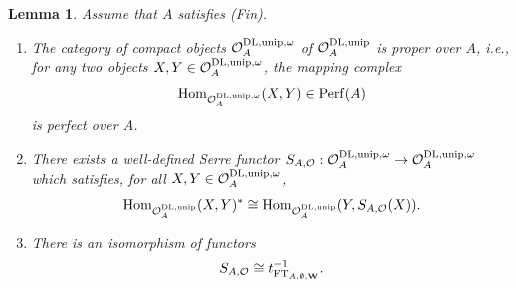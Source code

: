 \documentclass[a4paper, 10pt, oneside, reqno]{amsart}
\theoremstyle{plain}
\newtheorem{lem}[thm]{Lemma}
\theoremstyle{definition}
\theoremstyle{remark}
\newcommand{\FT}{\mathrm{FT}}
\begin{document}
\begin{lem}\label{lem:serre-duality-on-category-O}
Assume that $A$ satisfies (Fin). 
\begin{enumerate}
\item The category of compact objects $\mathcal{O}^{\mathrm{DL}, \mathrm{unip}, \omega}_A$ of $\mathcal{O}^{\mathrm{DL}, \mathrm{unip}}_A$ is proper over $A$, i.e., for any two objects $X,Y \in \mathcal{O}^{\mathrm{DL}, \mathrm{unip}, \omega}_A$, the mapping complex
$$\mathrm{Hom}_{\mathcal{O}^{\mathrm{DL}, \mathrm{unip}, \omega}_A}(X,Y) \in \mathrm{Perf}(A)$$
is perfect over $A$.
\item There exists a well-defined Serre functor $S_{A,\mathcal{O}} : \mathcal{O}^{\mathrm{DL}, \mathrm{unip}, \omega}_A \to \mathcal{O}^{\mathrm{DL}, \mathrm{unip}, \omega}_A$ which satisfies, for all $X,Y \in \mathcal{O}^{\mathrm{DL}, \mathrm{unip}, \omega}_A$, 
$$\mathrm{Hom}_{\mathcal{O}^{\mathrm{DL}, \mathrm{unip}}_A}(X,Y)^{*} \cong \mathrm{Hom}_{\mathcal{O}^{\mathrm{DL}, \mathrm{unip}}_A}(Y, S_{A, \mathcal{O}}(X)).$$
\item There is an isomorphism of functors 
$$S_{A, \Ocal} \cong t_{\FT_{A,\emptyset,\Wbf}}^{-1}.$$
\end{enumerate}
\end{lem}
\end{document}
